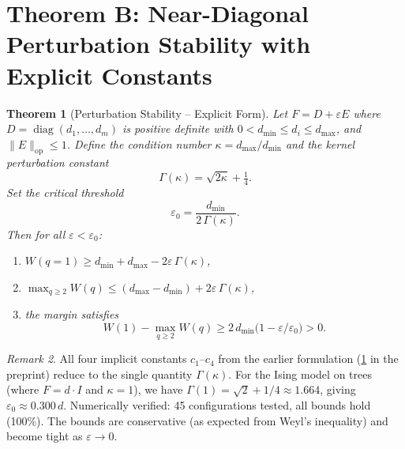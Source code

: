 \documentclass[11pt]{article}
\newtheorem{theorem}{Theorem}[section]
\theoremstyle{definition}
\theoremstyle{remark}
\newtheorem{remark}[theorem]{Remark}
\begin{document}
\section{Theorem B: Near-Diagonal Perturbation Stability with Explicit Constants}
\label{sec:theorem-B}

\begin{theorem}[Perturbation Stability -- Explicit Form]
\label{thm:perturbation}
Let $F = D + \varepsilon E$ where $D = \operatorname{diag}(d_1, \ldots, d_m)$
is positive definite with $0 < d_{\min} \leq d_i \leq d_{\max}$, and
$\|E\|_{\mathrm{op}} \leq 1$. Define the condition number $\kappa = d_{\max}/d_{\min}$
and the kernel perturbation constant
\begin{equation}
  \Gamma(\kappa) = \sqrt{2\kappa} + \tfrac{1}{4}.
  \label{eq:gamma-kappa}
\end{equation}
Set the critical threshold
\begin{equation}
  \varepsilon_0 = \frac{d_{\min}}{2\,\Gamma(\kappa)}.
  \label{eq:eps-star}
\end{equation}
Then for all $\varepsilon < \varepsilon_0$:
\begin{enumerate}
  \item[(a)] $W(q{=}1) \geq d_{\min} + d_{\max} - 2\varepsilon\,\Gamma(\kappa)$,
  \item[(b)] $\max_{q \geq 2} W(q) \leq (d_{\max} - d_{\min}) + 2\varepsilon\,\Gamma(\kappa)$,
  \item[(c)] the margin satisfies
    \begin{equation}
      W(1) - \max_{q \geq 2} W(q) \geq 2\,d_{\min}\bigl(1 - \varepsilon/\varepsilon_0\bigr) > 0.
      \label{eq:margin-explicit}
    \end{equation}
\end{enumerate}
\end{theorem}

\begin{remark}
All four implicit constants $c_1$--$c_4$ from the earlier formulation
(\cref{sec:theorem-B} in the preprint) reduce to the single quantity
$\Gamma(\kappa)$. For the Ising model on trees (where $F = d \cdot I$ and
$\kappa = 1$), we have $\Gamma(1) = \sqrt{2} + 1/4 \approx 1.664$, giving
$\varepsilon_0 \approx 0.300\,d$.
Numerically verified: 45 configurations tested, all bounds hold (100\%).
The bounds are conservative (as expected from Weyl's inequality) and become
tight as $\varepsilon \to 0$.
\end{remark}
\end{document}
